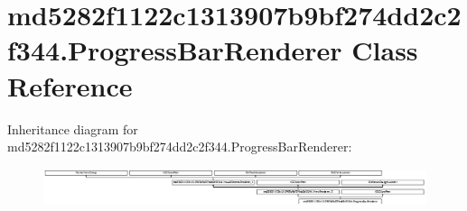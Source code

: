 \hypertarget{classmd5282f1122c1313907b9bf274dd2c2f344_1_1ProgressBarRenderer}{}\section{md5282f1122c1313907b9bf274dd2c2f344.\+Progress\+Bar\+Renderer Class Reference}
\label{classmd5282f1122c1313907b9bf274dd2c2f344_1_1ProgressBarRenderer}
Inheritance diagram for md5282f1122c1313907b9bf274dd2c2f344.\+Progress\+Bar\+Renderer\+:\begin{figure}[H]
\begin{center}
\leavevmode
\includegraphics[height=1.098039cm]{classmd5282f1122c1313907b9bf274dd2c2f344_1_1ProgressBarRenderer}
\end{center}
\end{figure}
